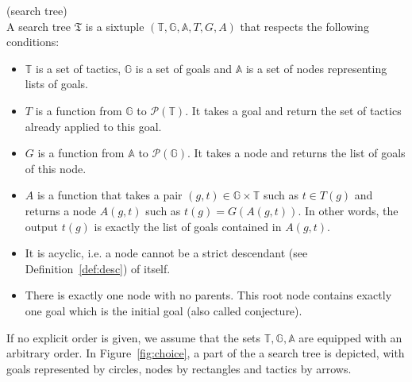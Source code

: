 \documentclass[runningheads,a4paper,draft]{svjour3}
\begin{document}
\begin{definition}\label{def:stree}(search tree)\\
A search tree $\mathfrak{T}$ is a sixtuple
$(\mathbb{T},\mathbb{G},\mathbb{A},T,G,A)$
that respects the following conditions:
\begin{itemize}
\item $\mathbb{T}$ is a set of tactics, $\mathbb{G}$ is a set of goals
 and $\mathbb{A}$ is a set of nodes representing lists of goals.
\item $T$ is a function from $\mathbb{G}$ to $\mathcal{P}(\mathbb{T})$. It
takes a goal and return the set of tactics already applied to this goal.
\item $G$ is a function from $\mathbb{A}$ to $\mathcal{P}(\mathbb{G})$.
It takes a node and returns the list of goals of this node.
\item $A$ is a function that takes a pair $(g,t)\in \mathbb{G} \times 
\mathbb{T}$ such as $t \in T(g)$ and 
returns a node $A(g,t)$ such as $t(g) = G(A(g,t))$. In other words, the output 
$t(g)$ is exactly the list of goals contained in $A(g,t)$.
\item It is acyclic, i.e. a node cannot be a strict descendant (see 
Definition~\ref{def:desc}) of itself.
\item There is exactly one node with no parents. This root node contains 
exactly one goal which is the initial goal (also called conjecture).
\end{itemize}

\end{definition}

If no explicit order is given, we assume that the sets
$\mathbb{T},\mathbb{G},\mathbb{A}$ are equipped with an
arbitrary order. In Figure~\ref{fig:choice}, a part of the a search tree is
depicted, with goals represented by circles, nodes by rectangles and tactics by
arrows.
\end{document}
